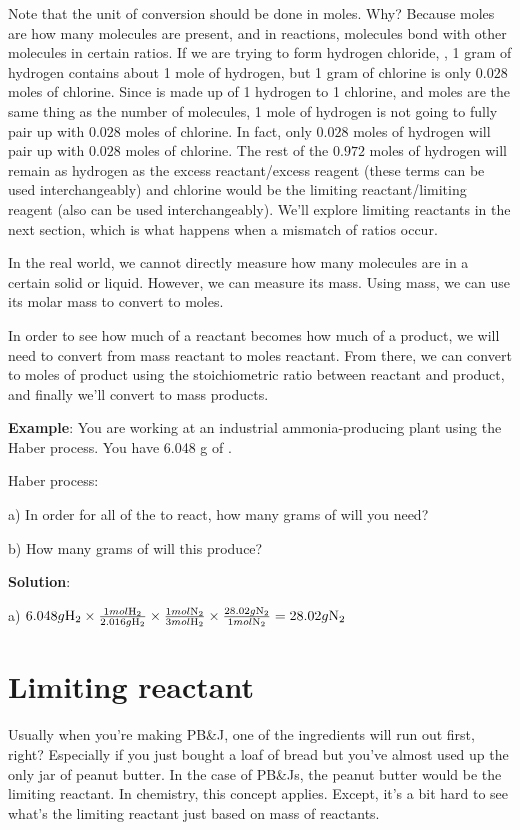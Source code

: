 \documentclass[letterpaper, 12pt]{article}
\begin{document}
Note that the unit of conversion should be done in moles. Why? Because moles are how many molecules are present, and in reactions, molecules bond with other molecules in certain ratios. If we are trying to form hydrogen chloride, , 1 gram of hydrogen contains about 1 mole of hydrogen, but 1 gram of chlorine is only $0.028$ moles of chlorine. Since  is made up of 1 hydrogen to 1 chlorine, and moles are the same thing as the number of molecules, 1 mole of hydrogen is not going to fully pair up with $0.028$ moles of chlorine. In fact, only $0.028$ moles of hydrogen will pair up with $0.028$ moles of chlorine. The rest of the $0.972$ moles of hydrogen will remain as hydrogen as the excess reactant/excess reagent (these terms can be used interchangeably) and chlorine would be the limiting reactant/limiting reagent (also can be used interchangeably). We'll explore limiting reactants in the next section, which is what happens when a mismatch of ratios occur.

In the real world, we cannot directly measure how many molecules are in a certain solid or liquid. However, we can measure its mass. Using mass, we can use its molar mass to convert to moles.

In order to see how much of a reactant becomes how much of a product, we will need to convert from mass reactant to moles reactant. From there, we can convert to moles of product using the stoichiometric ratio between reactant and product, and finally we'll convert to mass products.

\textbf{Example}: You are working at an industrial ammonia-producing plant using the Haber process. You have 6.048 g of .

Haber process: 

a) In order for all of the  to react, how many grams of  will you need?

b) How many grams of  will this produce?

\textbf{Solution}:

a) $6.048 g \ce{H2} \times \frac{1 mol \ce{H2}}{2.016 g \ce{H2}} \times \frac{1 mol \ce{N2}}{3 mol \ce{H2}} \times \frac{28.02 g \ce{N2}}{1 mol \ce{N2}} = 28.02 g \ce{N2}$

\section{Limiting reactant}
Usually when you're making PB\&J, one of the ingredients will run out first, right? Especially if you just bought a loaf of bread but you've almost used up the only jar of peanut butter. In the case of PB\&Js, the peanut butter would be the limiting reactant. In chemistry, this concept applies. Except, it's a bit hard to see what's the limiting reactant just based on mass of reactants.
\end{document}
